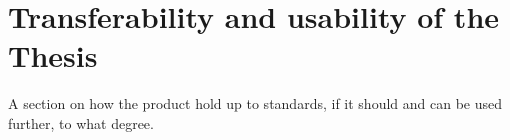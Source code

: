 \section{Transferability and usability of the Thesis}

A section on how the product hold up to standards, if it should and can be used further, to what degree.
